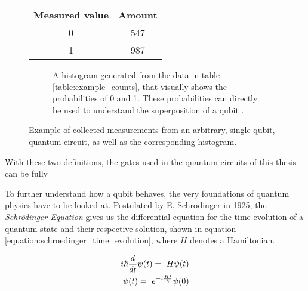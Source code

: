 \begin{figure}[!h]
    \begin{subtable}{.5\textwidth}
    \centering
    \begin{tabular}{|c|c|}
         Measured value & Amount  \\
         \hline
         0 & 547 \\
         1 & 987 \\
    \end{tabular}
    \caption{Table containing all measurements done on a qubit in an unknown superposition. The number of occurrences of a measured 1 or 0 is counted and then used to generate the histogram in figure \ref{figure:example_histogram}}
    \label{table:example_counts}
    \end{subtable}
    \begin{subfigure}{.5\textwidth}
        \centering
        \scalebox{\histogramwidth}{
            
        }
        \caption{A histogram generated from the data in table \ref{table:example_counts}, that visually shows the probabilities of 0 and 1. These probabilities can directly be used to understand the superposition of a qubit .}
        \label{figure:example_histogram}
    \end{subfigure}
    \caption{Example of collected measurements from an arbitrary, single qubit, quantum circuit, as well as the corresponding histogram.}
    \label{fig:my_label}
\end{figure}

With these two definitions, the gates used in the quantum circuits of this thesis can be fully 

\newpage

To further understand how a qubit behaves, the very foundations of quantum physics have to be looked at. Postulated by E. Schrödinger in 1925, the \emph{Schrödinger-Equation}\cite{PhysRev.28.1049} gives us the differential equation for the time evolution of a quantum state and their respective solution, shown in equation \ref{equation:schroedinger_time_evolution}, where $H$ denotes a Hamiltonian.

\begin{equation}
    \centering
    \begin{split}
          i\hbar\frac{d}{dt}\psi(t) =\ H\psi(t) \\
        \psi(t) =\ e^{-i\frac{Ht}{\hbar}}\psi(0)
    \end{split}
    \label{equation:schroedinger_time_evolution}
\end{equation}

